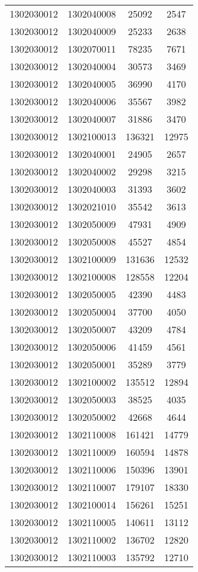 \begin{longtable}[h]{llcc}
		1302030012 & 1302040008 & 25092 & 2547\\
		1302030012 & 1302040009 & 25233 & 2638\\
		1302030012 & 1302070011 & 78235 & 7671\\
		1302030012 & 1302040004 & 30573 & 3469\\
		1302030012 & 1302040005 & 36990 & 4170\\
		1302030012 & 1302040006 & 35567 & 3982\\
		1302030012 & 1302040007 & 31886 & 3470\\
		1302030012 & 1302100013 & 136321 & 12975\\
		1302030012 & 1302040001 & 24905 & 2657\\
		1302030012 & 1302040002 & 29298 & 3215\\
		1302030012 & 1302040003 & 31393 & 3602\\
		1302030012 & 1302021010 & 35542 & 3613\\
		1302030012 & 1302050009 & 47931 & 4909\\
		1302030012 & 1302050008 & 45527 & 4854\\
		1302030012 & 1302100009 & 131636 & 12532\\
		1302030012 & 1302100008 & 128558 & 12204\\
		1302030012 & 1302050005 & 42390 & 4483\\
		1302030012 & 1302050004 & 37700 & 4050\\
		1302030012 & 1302050007 & 43209 & 4784\\
		1302030012 & 1302050006 & 41459 & 4561\\
		1302030012 & 1302050001 & 35289 & 3779\\
		1302030012 & 1302100002 & 135512 & 12894\\
		1302030012 & 1302050003 & 38525 & 4035\\
		1302030012 & 1302050002 & 42668 & 4644\\
		1302030012 & 1302110008 & 161421 & 14779\\
		1302030012 & 1302110009 & 160594 & 14878\\
		1302030012 & 1302110006 & 150396 & 13901\\
		1302030012 & 1302110007 & 179107 & 18330\\
		1302030012 & 1302100014 & 156261 & 15251\\
		1302030012 & 1302110005 & 140611 & 13112\\
		1302030012 & 1302110002 & 136702 & 12820\\
		1302030012 & 1302110003 & 135792 & 12710\\

\end{longtable}
